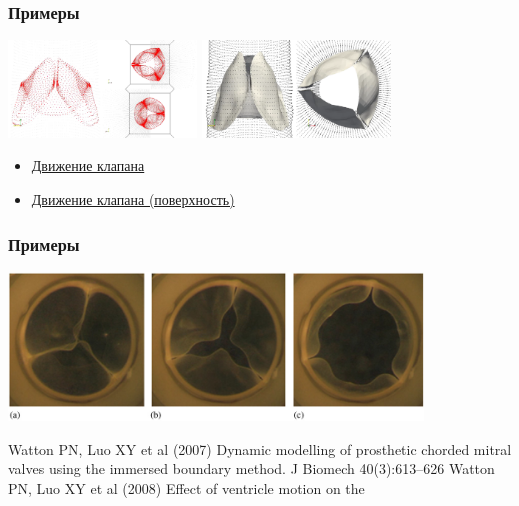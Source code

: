 \documentclass[14pt]{beamer}
\begin{document}
\begin{frame}
\frametitle{Примеры}
    \begin{center}
        \includegraphics[width=5cm]{valves_closing_accurate_two_avi.png}
        \vspace{0.40mm}
        \includegraphics[width=5cm]{valve_delaunay.png}
    \end{center}

\begin{itemize}
    \item[\MVRightarrow] \href{run:video/valves_closing_accurate_two.avi}{Движение клапана}
    \item[\MVRightarrow] \href{run:video/valve_delaunay.avi}{Движение клапана (поверхность)}
\end{itemize}
\end{frame}

\begin{frame}
\frametitle{Примеры}
    \begin{center}
        \includegraphics[width=11cm]{aortic_valves.jpg}
    \end{center}

\begin{spacing}{0.5}
{\scriptsize
    Watton PN, Luo XY et al (2007) Dynamic modelling of prosthetic
    chorded mitral valves using the immersed boundary method.
    J Biomech 40(3):613–626 Watton PN, Luo XY et al (2008) Effect of ventricle motion on the
}
\end{spacing}

\end{frame}
\end{document}
